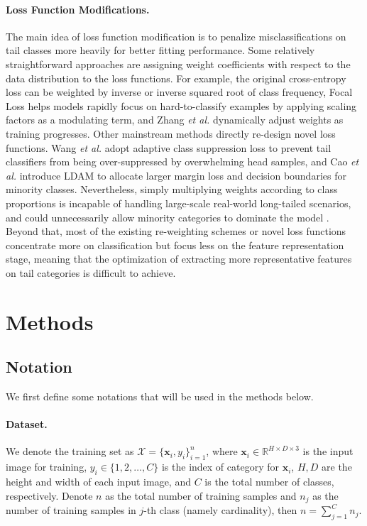 \documentclass{article}
\begin{document}
\paragraph{Loss Function Modifications.}The main idea of loss function modification is to penalize misclassifications on tail classes more heavily for better fitting performance. Some relatively straightforward approaches are assigning weight coefficients with respect to the data distribution to the loss functions. For example, the original cross-entropy loss can be weighted by inverse \cite{huang2016learning,wang2017learning} or inverse squared root \cite{mahajan2018exploring,mikolov2013distributed} of class frequency, Focal Loss \cite{lin2017focal} helps models rapidly focus on hard-to-classify examples by applying scaling factors as a modulating term, and Zhang \textit{et al.} \cite{zhang2021mining} dynamically adjust weights as training progresses. Other mainstream methods directly re-design novel loss functions. Wang \textit{et al.} \cite{wang2021adaptive} adopt adaptive class suppression loss to prevent tail classifiers from being over-suppressed by overwhelming head samples, and Cao \textit{et al.} \cite{cao2019learning} introduce LDAM to allocate larger margin loss and decision boundaries for minority classes. Nevertheless, simply multiplying weights according to class proportions is incapable of handling large-scale real-world long-tailed scenarios, and could unnecessarily allow minority categories to dominate the model \cite{jamal2020rethinking}. Beyond that, most of the existing re-weighting schemes or novel loss functions concentrate more on classification but focus less on the feature representation stage, meaning that the optimization of extracting more representative features on tail categories is difficult to achieve.



\section{Methods}
\subsection{Notation}We first define some notations that will be used in the methods below.

\paragraph{Dataset.} We denote the training set as $\mathcal{X}=\{\mathbf{x}_i,y_i\}_{i=1}^n$, where $\mathbf{x}_i\in\mathbb{R}^{H\times D\times 3}$ is the input image for training, $y_i\in\{1,2,\ldots,C\}$ is the index of category for $\mathbf{x}_i$, $H,D$ are the height and width of each input image, and $C$ is the total number of classes, respectively. Denote $n$ as the total number of training samples and $n_j$ as the number of training samples in $j$-th class (namely cardinality), then $n=\sum_{j=1}^{C} n_j$.
\end{document}
